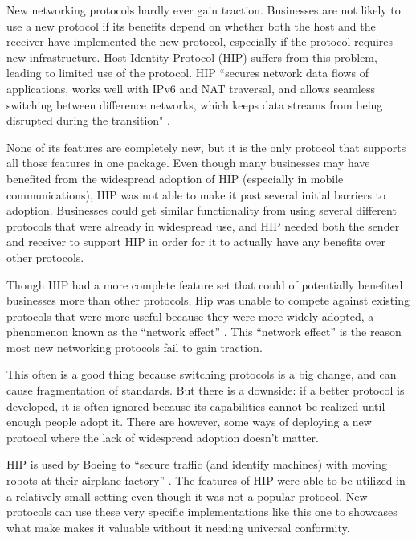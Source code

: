 New networking protocols hardly ever gain traction. Businesses are not likely to use a new protocol if its benefits depend on whether both the host and the receiver have implemented the new protocol, especially if the protocol requires new infrastructure. Host Identity Protocol (HIP) suffers from this problem, leading to limited use of the protocol. HIP “secures network data flows of applications, works well with IPv6 and NAT traversal, and allows seamless switching between difference networks, which keeps data streams from being disrupted during the transition" \cite{Leva:2013:ABN:2494664.2494695}. 

None of its features are completely new, but it is the only protocol that supports all those features in one package. Even though many businesses may have benefited from the widespread adoption of HIP (especially in mobile communications), HIP was not able to make it past several initial barriers to adoption. Businesses could get similar functionality from using several different protocols that were already in widespread use, and HIP needed both the sender and receiver to support HIP in order for it to actually have any benefits over other protocols. 

Though HIP had a more complete feature set that could of potentially benefited businesses more than other protocols, Hip was unable to compete against existing protocols that were more useful because they were more widely adopted, a phenomenon known as the “network effect” \cite{Leva:2013:ABN:2494664.2494695}.  This “network effect” is the reason most new networking protocols fail to gain traction. 

This often is a good thing because switching protocols is a big change, and can cause fragmentation of standards. But there is a downside: if a better protocol is developed, it is often ignored because its capabilities cannot be realized until enough people adopt it. There are however, some ways of deploying a new protocol where the lack of widespread adoption doesn’t matter. 

HIP is used by Boeing to “secure traffic (and identify machines) with moving robots at their airplane factory” 
\cite{Leva:2013:ABN:2494664.2494695}.  The features of HIP were able to be utilized in a relatively small setting even though it was not a popular protocol. New protocols can use these very specific implementations like this one to showcases what make makes it valuable without it needing universal conformity.